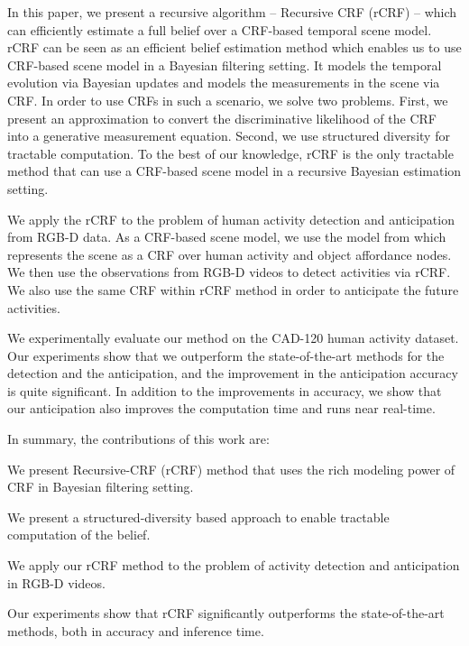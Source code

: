 In this paper, we present a recursive algorithm -- Recursive CRF (rCRF) -- which can efficiently estimate a full belief over a CRF-based temporal scene model. rCRF can be seen as an efficient belief estimation method which enables us to use CRF-based scene model in a Bayesian filtering setting. It models the temporal evolution via Bayesian updates and models the measurements in the scene via CRF. In order to use CRFs in such a scenario, we solve two problems. First, we present an approximation to convert the discriminative likelihood of the CRF into a generative measurement equation. Second, we use structured diversity for tractable computation. To the best of our knowledge, rCRF is the only tractable method that can use a CRF-based scene model in a recursive Bayesian estimation setting.

We apply the rCRF to the problem of human activity detection and anticipation from RGB-D data. As a CRF-based scene model, we use the model from \cite{hemaIJRR} which represents the scene as a CRF over human activity and object affordance nodes. We then use the observations from RGB-D videos to detect activities via rCRF. We also use the same CRF within rCRF method in order to anticipate the future activities.

We experimentally evaluate our method on the \mbox{CAD-120} \cite{hemaIJRR} human activity dataset. Our experiments show that we outperform the state-of-the-art methods for the detection and the anticipation, and the improvement in the anticipation accuracy is quite significant. In addition to the improvements in accuracy, we show that our anticipation also improves the computation time and runs near real-time.


In summary, the contributions of this work are:
\begin{packed_item}
\item  We present Recursive-CRF (rCRF) method that uses the rich modeling power of CRF in
Bayesian filtering setting.
\item  We present a structured-diversity based approach to enable tractable computation of the belief.
\item  We apply our rCRF method to the problem of activity detection and anticipation in
RGB-D videos.
\item  Our experiments show that rCRF significantly outperforms the state-of-the-art methods, both in accuracy and inference time.
\end{packed_item}
